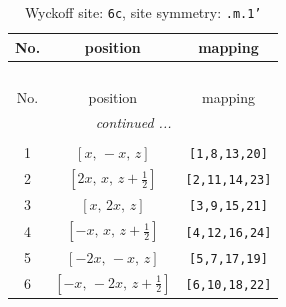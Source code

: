 \documentclass[fleqn,8pt]{jsarticle}
\begin{document}
\renewcommand{\arraystretch}{1.2}
\begin{longtable}{ccc}
\caption{Wyckoff site: {\tt 6c}, site symmetry: {\tt .m.1'}}
 \\
 \hline \hline
No. & position & mapping \\ \hline \endfirsthead

\multicolumn{2}{l}{\tablename\ \thetable{}} \\
 \hline \hline
No. & position & mapping \\ \hline \endhead

 \hline \hline
\multicolumn{2}{r}{\footnotesize\it continued ...} \\ \endfoot

 \hline \hline
\multicolumn{2}{r}{} \\ \endlastfoot

1 & $\left[ x,\, - x,\, z \right]$ & {\tt [1,8,13,20]} \\ \hline
2 & $\left[ 2 x,\, x,\, z + \frac{1}{2} \right]$ & {\tt [2,11,14,23]} \\ \hline
3 & $\left[ x,\, 2 x,\, z \right]$ & {\tt [3,9,15,21]} \\ \hline
4 & $\left[ - x,\, x,\, z + \frac{1}{2} \right]$ & {\tt [4,12,16,24]} \\ \hline
5 & $\left[ - 2 x,\, - x,\, z \right]$ & {\tt [5,7,17,19]} \\ \hline
6 & $\left[ - x,\, - 2 x,\, z + \frac{1}{2} \right]$ & {\tt [6,10,18,22]} \\
\end{longtable}
\renewcommand{\arraystretch}{1.2}
\end{document}
